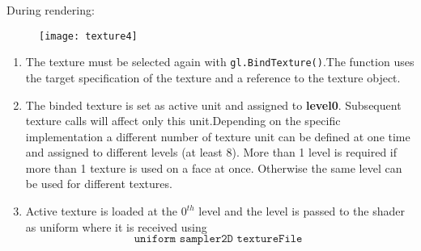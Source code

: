 During rendering:
\begin{figure}[H]
 \centering
 \texttt{[image: texture4]} 
\end{figure} 
\begin{enumerate}
\item The texture must be selected again with \texttt{gl.BindTexture()}.The function uses the target specification of the texture and a reference to the texture object.
\item The binded texture is set as active unit and assigned to \textbf{level0}. Subsequent texture calls will affect only this unit.Depending on the specific implementation a different number of texture unit can be defined at one time and assigned to different levels (at least 8). More than 1 level is required if more than 1 texture is used on a face at once. Otherwise the same level can be used for different textures.
\item  Active texture is loaded at the $0^{th}$ level and the level is passed to the shader as uniform where it is received using $$ \texttt{uniform sampler2D textureFile }$$
\end{enumerate} 